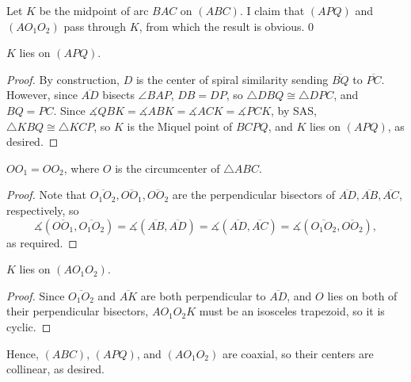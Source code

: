 Let $K$ be the midpoint of arc $BAC$ on $(ABC)$. I claim that $(APQ)$ and $(AO_1O_2)$ pass through $K$, from which the result is obvious.
\setcounter{claim}0
\begin{claim}
    $K$ lies on $(APQ)$.
\end{claim}
\begin{proof}
    By construction, $D$ is the center of spiral similarity sending $\overline{BQ}$ to $\overline{PC}$. However, since $\overline{AD}$ bisects $\angle BAP$, $DB=DP$, so $\triangle DBQ\cong\triangle DPC$, and $BQ=PC$. Since $\measuredangle QBK=\measuredangle ABK=\measuredangle ACK=\measuredangle PCK$, by SAS, $\triangle KBQ\cong\triangle KCP$, so $K$ is the Miquel point of $BCPQ$, and $K$ lies on $(APQ)$, as desired.
\end{proof}
\begin{claim}
    $OO_1=OO_2$, where $O$ is the circumcenter of $\triangle ABC$.
\end{claim}
\begin{proof}
    Note that $\overline{O_1O_2},\overline{OO_1},\overline{OO_2}$ are the perpendicular bisectors of $\overline{AD},\overline{AB},\overline{AC}$, respectively, so \[\measuredangle(\overline{OO_1},\overline{O_1O_2})=\measuredangle(\overline{AB},\overline{AD})=\measuredangle(\overline{AD},\overline{AC})=\measuredangle(\overline{O_1O_2},\overline{OO_2}),\]
    as required.
\end{proof}
\begin{claim}
    $K$ lies on $(AO_1O_2)$.
\end{claim}
\begin{proof}
    Since $\overline{O_1O_2}$ and $\overline{AK}$ are both perpendicular to $\overline{AD}$, and $O$ lies on both of their perpendicular bisectors, $AO_1O_2K$ must be an isosceles trapezoid, so it is cyclic.
\end{proof}

Hence, $(ABC)$, $(APQ)$, and $(AO_1O_2)$ are coaxial, so their centers are collinear, as desired.
